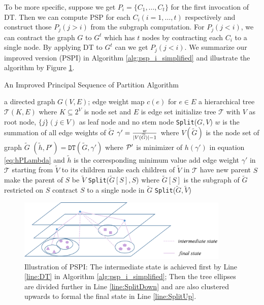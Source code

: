 To be more specific, suppose we get $P_i = \{C_1, \dots, C_t\}$ for the first invocation of DT. Then we can compute PSP for each $C_i(i=1,\dots, t)$ respectively and construct those $P_j(j>i)$ from the subgraph computation. For $P_j(j<i)$, we can contract the graph $G$  to $G^t$ which has $t$ nodes by contracting each $C_i$ to a single node. By applying DT to $G^t$ can we get $P_j(j<i)$. We summarize our improved version (PSPI) in Algorithm \ref{alg:psp_i_simplified} and illustrate the algorithm by Figure \ref{fig:pspi}.

\begin{algorithm}
	\caption{An Improved Principal Sequence of Partition Algorithm}\label{alg:psp_i_simplified}
	\begin{algorithmic}[1]
		\REQUIRE a directed graph $G(V, E)$; edge weight map $c(e)$ for $e\in E$
		\ENSURE a hierarchical tree $\mathcal{T}(K, E)$ where $K \subseteq 2^{V}$ is node set and $E$ is edge set
		\STATE initialize tree $\mathcal{T}$ with $V$ as root node, $\{j\}(j \in V)$ as leaf node and no stem node
		\STATE \texttt{Split}($G, V$)
		\STATE $w$ is the summation of all edge weights of $\widetilde{G}$ 
		\STATE $\gamma' = \frac{w}{\abs{V(\widetilde{G})}-1}$ where $V(\widetilde{G})$ is the node set of graph $\widetilde{G}$ \label{alg:gamma_apostrophe}
		\STATE $(\tilde{h}, P') = \texttt{DT}(\widetilde{G}, \gamma')$ where $\P'$ is minimizer of $h(\gamma')$ in equation \eqref{eq:hPLambda} and $\tilde{h}$ is the corresponding minimum value  \label{line:DT}
		\STATE add edge weight $\gamma'$ in $\mathcal{T}$ starting from $\widetilde{V}$ to its children
		\ELSE
		\STATE make each children of $\widetilde{V}$ in $\mathcal{T}$ have new parent $S$		
		\STATE make the parent of $S$ be $\widetilde{V}$
		\STATE \texttt{Split}($\widetilde{G}[S], S$) where $\widetilde{G}[S]$ is the subgraph of $\widetilde{G}$ restricted on $S$ \label{line:SplitDown}
		\STATE contract $S$ to a single node in $\widetilde{G}$ %
		\ENDFOR 
		\STATE \texttt{Split}($\widetilde{G}, \widetilde{V}$)		\label{line:SplitUp}
		\ENDIF
		\ENDFUNCTION
	\end{algorithmic}
\end{algorithm}

\begin{figure}
\centering
\includegraphics[width=0.9\textwidth]{improved_alg.png}
\caption{Illustration of PSPI: The intermediate state is achieved first by Line \ref{line:DT} in Algorithm \ref{alg:psp_i_simplified};
Then the tree ellipses are divided further in Line \ref{line:SplitDown} and are also clustered upwards to formal the final state in Line \ref{line:SplitUp}.}\label{fig:pspi}
\end{figure}

